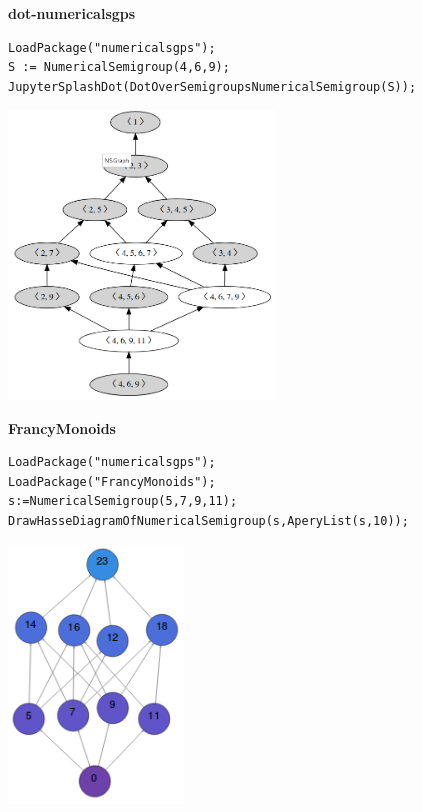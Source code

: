 \documentclass[10pt,compress]{beamer}
\begin{document}
\begin{frame}[fragile]
  \begin{center}
  {\color{ChetwodeBlue}\Large\textbf{dot-numericalsgps}}    
  \end{center}
\begin{verbatim}
LoadPackage("numericalsgps");
S := NumericalSemigroup(4,6,9);
JupyterSplashDot(DotOverSemigroupsNumericalSemigroup(S));
\end{verbatim}

\begin{center}
\includegraphics[width=0.53\textwidth]{./images/over-semigroups.png}  
\end{center}
\end{frame}

\begin{frame}[fragile]
  \begin{center}
  {\color{ChetwodeBlue}\Large\textbf{FrancyMonoids}}    
  \end{center}
\begin{verbatim}
LoadPackage("numericalsgps");
LoadPackage("FrancyMonoids");
s:=NumericalSemigroup(5,7,9,11);
DrawHasseDiagramOfNumericalSemigroup(s,AperyList(s,10));
\end{verbatim}

\begin{center}
\includegraphics[width=0.35\textwidth]{./images/apery.png}  
\end{center}
\end{frame}
\end{document}

